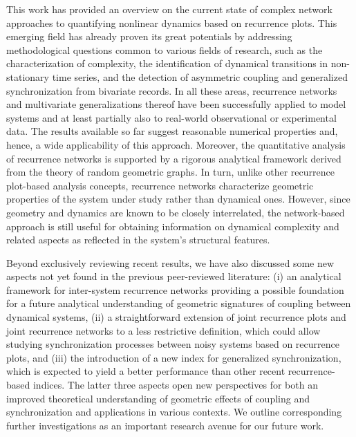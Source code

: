 \documentclass[graybox]{svmult}
\begin{document}
This work has provided an overview on the current state of complex network approaches to quantifying nonlinear dynamics based on recurrence plots. This emerging field has already proven its great potentials by addressing methodological questions common to various fields of research, such as the characterization of complexity, the identification of dynamical transitions in non-stationary time series, and the detection of asymmetric coupling and generalized synchronization from bivariate records. In all these areas, recurrence networks and multivariate generalizations thereof have been successfully applied to model systems and at least partially also to real-world observational or experimental data. The results available so far suggest reasonable numerical properties and, hence, a wide applicability of this approach. Moreover, the quantitative analysis of recurrence networks is supported by a rigorous analytical framework derived from the theory of random geometric graphs. In turn, unlike other recurrence plot-based analysis concepts, recurrence networks characterize geometric properties of the system under study rather than dynamical ones. However, since geometry and dynamics are known to be closely interrelated, the network-based approach is still useful for obtaining information on dynamical complexity and related aspects as reflected in the system's structural features.

Beyond exclusively reviewing recent results, we have also discussed some new aspects not yet found in the previous peer-reviewed literature: (i) an analytical framework for inter-system recurrence networks providing a possible foundation for a future analytical understanding of geometric signatures of coupling between dynamical systems, (ii) a straightforward extension of joint recurrence plots and joint recurrence networks to a less restrictive definition, which could allow studying synchronization processes between noisy systems based on recurrence plots, and (iii) the introduction of a new index for generalized synchronization, which is expected to yield a better performance than other recent recurrence-based indices. The latter three aspects open new perspectives for both an improved theoretical understanding of geometric effects of coupling and synchronization and applications in various contexts. We outline corresponding further investigations as an important research avenue for our future work.


\end{document}
